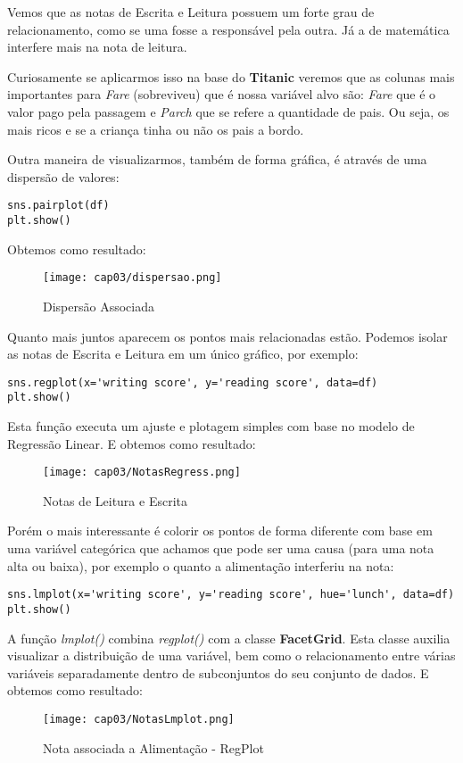 Vemos que as notas de Escrita e Leitura possuem um forte grau de relacionamento, como se uma fosse a responsável pela outra. Já a de matemática interfere mais na nota de leitura.

Curiosamente se aplicarmos isso na base do \textbf{Titanic} veremos que as colunas mais importantes para \textit{Fare} (sobreviveu) que é nossa variável alvo são: \textit{Fare} que é o valor pago pela passagem e \textit{Parch} que se refere a quantidade de pais. Ou seja, os mais ricos e se a criança tinha ou não os pais a bordo. 

Outra maneira de visualizarmos, também de forma gráfica, é através de uma dispersão de valores:
\begin{lstlisting}
sns.pairplot(df)
plt.show()
\end{lstlisting}

Obtemos como resultado:
\begin{figure}[H]
	\centering
	\texttt{[image: cap03/dispersao.png]}
	\caption{Dispersão Associada}
\end{figure}

Quanto mais juntos aparecem os pontos mais relacionadas estão. Podemos isolar as notas de Escrita e Leitura em um único gráfico, por exemplo:
\begin{lstlisting}
sns.regplot(x='writing score', y='reading score', data=df)
plt.show()
\end{lstlisting}

Esta função executa um ajuste e plotagem simples com base no modelo de Regressão Linear. E obtemos como resultado:
\begin{figure}[H]
	\centering
	\texttt{[image: cap03/NotasRegress.png]}
	\caption{Notas de Leitura e Escrita}
\end{figure}

Porém o mais interessante é colorir os pontos de forma diferente com base em uma variável categórica que achamos que pode ser uma causa (para uma nota alta ou baixa), por exemplo o quanto a alimentação interferiu na nota:
\begin{lstlisting}
sns.lmplot(x='writing score', y='reading score', hue='lunch', data=df)
plt.show()
\end{lstlisting}

A função \textit{lmplot()} combina \textit{regplot()} com a classe \textbf{FacetGrid}. Esta classe auxilia visualizar a distribuição de uma variável, bem como o relacionamento entre várias variáveis separadamente dentro de subconjuntos do seu conjunto de dados. E obtemos como resultado:
\begin{figure}[H]
	\centering
	\texttt{[image: cap03/NotasLmplot.png]}
	\caption{Nota associada a Alimentação - RegPlot}
\end{figure}

